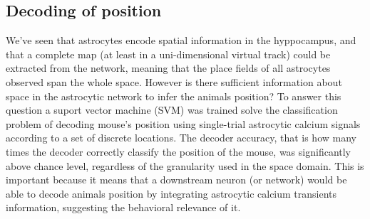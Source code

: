 \subsection{Decoding of position}
\label{chap1:sec:3:subsec2:position_decoding}
We've seen that astrocytes encode spatial information in the hyppocampus, and that a complete map (at least in a uni-dimensional virtual track) could be extracted from the network, meaning that the place fields of all astrocytes observed span the whole space. 
However is there sufficient information about space in the astrocytic network to infer the animals position? 
To answer this question a suport vector machine (SVM) was trained solve the classification problem of decoding mouse's position using single-trial astrocytic calcium signals according to a set of discrete locations. 
The decoder accuracy, that is how many times the decoder correctly classify the position of the mouse, was significantly above chance level, regardless of the granularity used in the space domain. 
This is important because it means that a downstream neuron (or network) would be able to decode animals position by integrating astrocytic calcium transients information, suggesting the behavioral relevance of it. 




